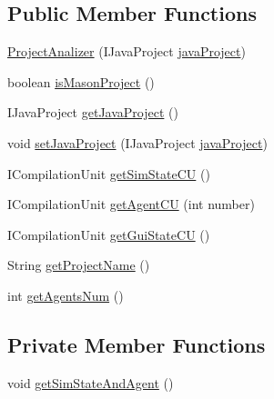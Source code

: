 \subsection*{Public Member Functions}
\begin{DoxyCompactItemize}
\item 
\hyperlink{classit_1_1isislab_1_1masonhelperdocumentation_1_1analizer_1_1_project_analizer_ad3d06db1f30dc382bb3e39e302976854}{Project\-Analizer} (I\-Java\-Project \hyperlink{classit_1_1isislab_1_1masonhelperdocumentation_1_1analizer_1_1_project_analizer_a8df706a1af9fdd057124a0e0d13a675d}{java\-Project})
\item 
boolean \hyperlink{classit_1_1isislab_1_1masonhelperdocumentation_1_1analizer_1_1_project_analizer_a57a1bbfb21c09b106d6fa90ad3709d35}{is\-Mason\-Project} ()
\item 
I\-Java\-Project \hyperlink{classit_1_1isislab_1_1masonhelperdocumentation_1_1analizer_1_1_project_analizer_a4a57fff0ffa09f9ca4ba195c437cc08a}{get\-Java\-Project} ()
\item 
void \hyperlink{classit_1_1isislab_1_1masonhelperdocumentation_1_1analizer_1_1_project_analizer_a9fddcfb26ed45704e63a033bc88158cd}{set\-Java\-Project} (I\-Java\-Project \hyperlink{classit_1_1isislab_1_1masonhelperdocumentation_1_1analizer_1_1_project_analizer_a8df706a1af9fdd057124a0e0d13a675d}{java\-Project})
\item 
I\-Compilation\-Unit \hyperlink{classit_1_1isislab_1_1masonhelperdocumentation_1_1analizer_1_1_project_analizer_ab45de2e388d612362f7c79004aa73788}{get\-Sim\-State\-C\-U} ()
\item 
I\-Compilation\-Unit \hyperlink{classit_1_1isislab_1_1masonhelperdocumentation_1_1analizer_1_1_project_analizer_a08d40707306cdd51104477c0148efb0a}{get\-Agent\-C\-U} (int number)
\item 
I\-Compilation\-Unit \hyperlink{classit_1_1isislab_1_1masonhelperdocumentation_1_1analizer_1_1_project_analizer_afcb9cd776166de6502ac5bff01357457}{get\-Gui\-State\-C\-U} ()
\item 
String \hyperlink{classit_1_1isislab_1_1masonhelperdocumentation_1_1analizer_1_1_project_analizer_a5d6c2d9f5f1dd291744e6dd38f4407d0}{get\-Project\-Name} ()
\item 
int \hyperlink{classit_1_1isislab_1_1masonhelperdocumentation_1_1analizer_1_1_project_analizer_a48a20f5da4980049099e61b2586ee568}{get\-Agents\-Num} ()
\end{DoxyCompactItemize}
\subsection*{Private Member Functions}
\begin{DoxyCompactItemize}
\item 
void \hyperlink{classit_1_1isislab_1_1masonhelperdocumentation_1_1analizer_1_1_project_analizer_af2dfc3e88c4c1411d928017ed4957e1c}{get\-Sim\-State\-And\-Agent} ()
\end{DoxyCompactItemize}
